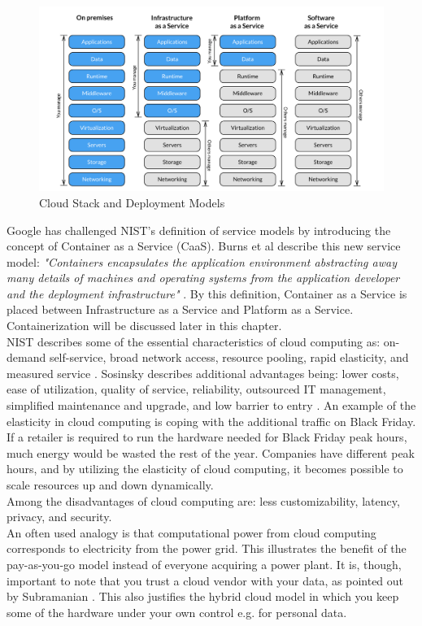 \begin{figure}[H]
  \includegraphics[scale=0.55]{figures/cloud_stack}
  \caption{Cloud Stack and Deployment Models}
\end{figure}
\label{fig:cloud_stack}

\noindent
Google has challenged NIST's definition of service models by introducing the concept of Container as a Service (CaaS). Burns et al describe this new service model: \textit{"Containers encapsulates the application environment abstracting away many details of machines and operating systems from the application developer and the deployment infrastructure"} \cite[p. 74]{burns2016borg_omega_kubernetes}. By this definition, Container as a Service is placed between Infrastructure as a Service and Platform as a Service. Containerization will be discussed later in this chapter. \\

\noindent
NIST describes some of the essential characteristics of cloud computing as: on-demand self-service, broad network access, resource pooling, rapid elasticity, and measured service \cite[p. 2]{nist2011definition}. Sosinsky describes additional advantages being: lower costs, ease of utilization, quality of service, reliability, outsourced IT management, simplified maintenance and upgrade, and low barrier to entry \cite[p.17-18]{sosinsky2011cloud}. 
An example of the elasticity in cloud computing is coping with the additional traffic on Black Friday. If a retailer is required to run the hardware needed for Black Friday peak hours, much energy would be wasted the rest of the year. Companies have different peak hours, and by utilizing the elasticity of cloud computing, it becomes possible to scale resources up and down dynamically. \\

\noindent
Among the disadvantages of cloud computing are: less customizability, latency, privacy, and security. \\

\noindent
An often used analogy is that computational power from cloud computing corresponds to electricity from the power grid. This illustrates the benefit of the pay-as-you-go model instead of everyone acquiring a power plant. It is, though, important to note that you trust a cloud vendor with your data, as pointed out by Subramanian \cite{subramanian2010electricity_metaphor}. This also justifies the hybrid cloud model in which you keep some of the hardware under your own control e.g. for personal data.


